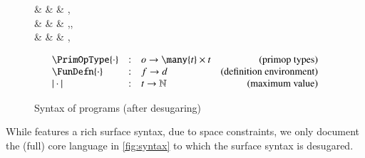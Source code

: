 \documentclass[9pt\ifFinal\else,preprint,nocopyrightspace\fi,\ifAlpha\else natbib,authoryear\fi]{sigplanconf}
\begin{document}
\begin{figure}
\begin{grammar}
       &                & \ni       & ,  \\
    &                & \ni       & ,, \\
   &                & \ni       & ,  \\
\end{grammar}
\begin{displaymath}
  \begin{array}{lclr}
    \PrimOpType{\cdot} & : & o \rightarrow \many{t} \times t & \text{(primop types)} \\
    \FunDefn{\cdot} &  : & f \rightarrow d  & \text{(definition environment)}\\
    |\cdot| & : & t \rightarrow \mathbb{N} & \text{(maximum value)}  \\
  \end{array}
\end{displaymath}
\caption{Syntax of \CDSL programs (after desugaring)}
\label{fig:syntax}
\end{figure}
\noindent 
While \CDSL features a rich surface syntax, due to space constraints, we only document the (full) core language in \autoref{fig:syntax} to which the surface syntax is desugared.
\end{document}
